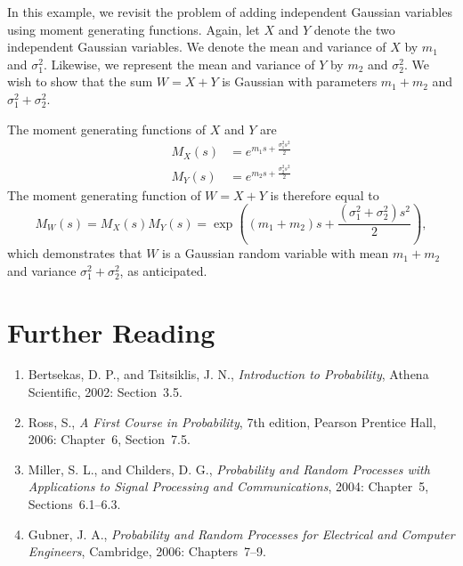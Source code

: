 \begin{example}
In this example, we revisit the problem of adding independent Gaussian variables using moment generating functions.
Again, let $X$ and $Y$ denote the two independent Gaussian variables.
We denote the mean and variance of $X$ by $m_1$ and $\sigma_1^2$.
Likewise, we represent the mean and variance of $Y$ by $m_2$ and $\sigma_2^2$.
We wish to show that the sum $W = X + Y$ is Gaussian with parameters $m_1 + m_2$ and $\sigma_1^2 + \sigma_2^2$.

The moment generating functions of $X$ and $Y$ are
\begin{align*}
M_X (s) &= e^{m_1 s + \frac{\sigma_1^2 s^2}{2}} \\
M_Y (s) &= e^{m_2 s + \frac{\sigma_2^2 s^2}{2}}
\end{align*}
The moment generating function of $W = X + Y$ is therefore equal to
\begin{equation*}
M_W (s) = M_X (s) M_Y (s)
= \exp \left( (m_1 + m_2) s + \frac{(\sigma_1^2 + \sigma_2^2) s^2}{2} \right) ,
\end{equation*}
which demonstrates that $W$ is a Gaussian random variable with mean $m_1 + m_2$ and variance $\sigma_1^2 + \sigma_2^2$, as anticipated.
\end{example}


\section*{Further Reading}

\begin{small}
\begin{enumerate}
\item Bertsekas, D. P., and Tsitsiklis, J. N., \emph{Introduction to Probability}, Athena Scientific, 2002: Section~3.5.
\item Ross, S., \emph{A First Course in Probability}, 7th edition, Pearson Prentice Hall, 2006: Chapter~6, Section~7.5.
\item Miller, S. L., and Childers, D. G., \emph{Probability and Random Processes with Applications to Signal Processing and Communications}, 2004: Chapter~5, Sections~6.1--6.3.
\item Gubner, J. A., \emph{Probability and Random Processes for Electrical and Computer Engineers}, Cambridge, 2006: Chapters~7--9.
\end{enumerate}
\end{small}

